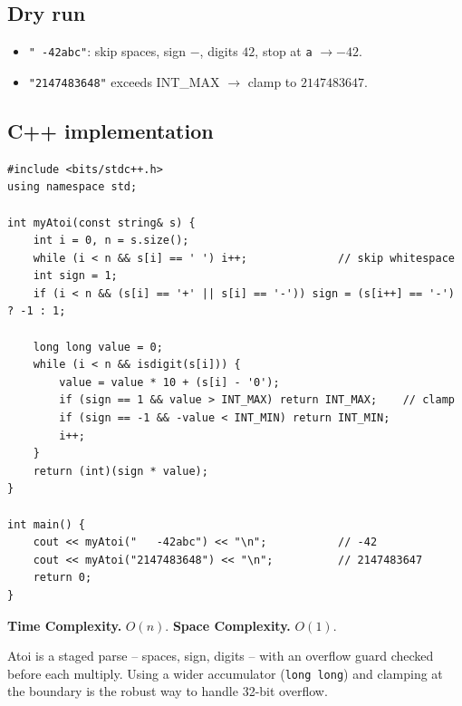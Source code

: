 \subsection*{Dry run}


\begin{itemize}
  \item \texttt{"   -42abc"}: skip spaces, sign $-$, digits $42$, stop at
        \texttt{a} $\to -42$.
  \item \texttt{"2147483648"} exceeds INT\_MAX $\to$ clamp to
        $2147483647$.
\end{itemize}

\subsection*{C++ implementation}

\begin{lstlisting}
#include <bits/stdc++.h>
using namespace std;

int myAtoi(const string& s) {
    int i = 0, n = s.size();
    while (i < n && s[i] == ' ') i++;              // skip whitespace
    int sign = 1;
    if (i < n && (s[i] == '+' || s[i] == '-')) sign = (s[i++] == '-') ? -1 : 1;

    long long value = 0;
    while (i < n && isdigit(s[i])) {
        value = value * 10 + (s[i] - '0');
        if (sign == 1 && value > INT_MAX) return INT_MAX;    // clamp
        if (sign == -1 && -value < INT_MIN) return INT_MIN;
        i++;
    }
    return (int)(sign * value);
}

int main() {
    cout << myAtoi("   -42abc") << "\n";           // -42
    cout << myAtoi("2147483648") << "\n";          // 2147483647
    return 0;
}
\end{lstlisting}

\begin{complexitybox}
\textbf{Time Complexity.} $O(n)$. \textbf{Space Complexity.} $O(1)$.
\end{complexitybox}

\begin{takeawaybox}
Atoi is a staged parse -- spaces, sign, digits -- with an overflow guard
checked before each multiply. Using a wider accumulator (\texttt{long long})
and clamping at the boundary is the robust way to handle 32-bit overflow.
\end{takeawaybox}
